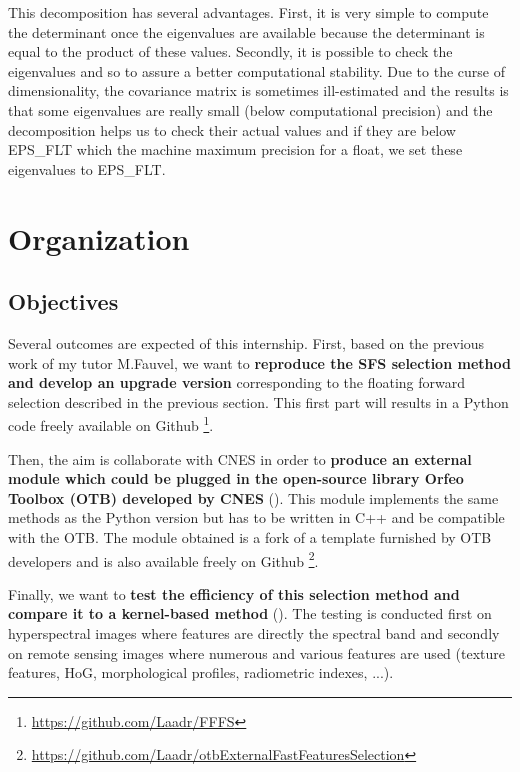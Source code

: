 \documentclass[a4paper,11pt,DIV=16]{scrartcl}
\begin{document}
        This decomposition has several advantages. First, it is very simple to compute the determinant once the eigenvalues are available because the determinant is equal to the product of these values. Secondly, it is possible to check the eigenvalues and so to assure a better computational stability. Due to the curse of dimensionality, the covariance matrix is sometimes ill-estimated and the results is that some eigenvalues are really small (below computational precision) and the decomposition helps us to check their actual values and if they are below EPS\_FLT which the machine maximum precision for a float, we set these eigenvalues to EPS\_FLT.

\section{Organization}
\label{sec:orga}

    \subsection{Objectives}

    Several outcomes are expected of this internship. First, based on the previous work \cite{fauvel2015fast} of my tutor M.Fauvel, we want to {\bfseries reproduce the SFS selection method and develop an upgrade version} corresponding to the floating forward selection described in the previous section. This first part will results in a Python code freely available on Github \footnote{\url{https://github.com/Laadr/FFFS}}.

    Then, the aim is collaborate with CNES in order to {\bfseries produce an external module which could be plugged in the open-source library Orfeo Toolbox (OTB) developed by CNES} (\cite{christophe2008orfeo}). This module implements the same methods as the Python version but has to be written in C++ and be compatible with the OTB. The module obtained is a fork of a template furnished by OTB developers and is also available freely on Github \footnote{\url{https://github.com/Laadr/otbExternalFastFeaturesSelection}}.

    Finally, we want to {\bfseries test the efficiency of this selection method and compare it to a kernel-based method} (\cite{camps2010remote}). The testing is conducted first on hyperspectral images where features are directly the spectral band and secondly on remote sensing images where numerous and various features are used (texture features, HoG, morphological profiles, radiometric indexes, ...).
\end{document}
